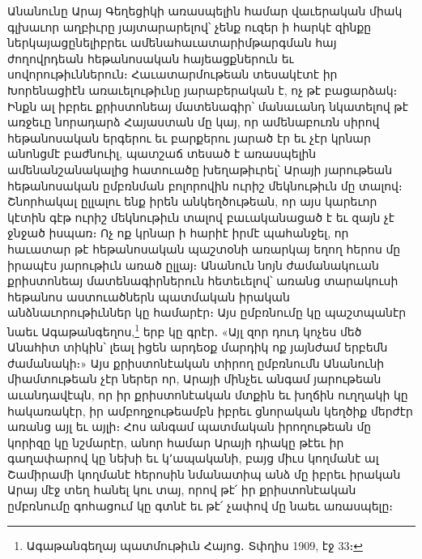 \documentclass{article}
\begin{document}
{Անանունը Արայ Գեղեցիկի առասպելին համար վաւերական միակ գլխաւոր աղբիւրը յայտարարելով՝ չենք ուզեր ի հարկէ զինքը ներկայացընելիբրեւ ամենահաւատարիմթարգման հայ ժողովրդեան հեթանոսական հայեացքներուն եւ սովորութիւններուն։ Հաւատարմութեան տեսակէտէ իր Խորենացիէն առաւելութիւնը յարաբերական է, ոչ թէ բացարձակ։ Ինքն ալ իբրեւ քրիստոնեայ մատենագիր՝ մանաւանդ նկատելով թէ առջեւը նորադարձ Հայաստան մը կայ, որ ամենաբուռն սիրով հեթանոսական երգերու եւ բարքերու յարած էր եւ չէր կրնար անոնցմէ բաժնուիլ, պատշաճ տեսած է առասպելին ամենանշանակալից հատուածը խեղաթիւրել՝ Արայի յարութեան հեթանոսական ըմբռնման բոլորովին ուրիշ մեկնութիւն մը տալով։ Շնորհակալ ըլլալու ենք իրեն անկեղծութեան, որ այս կարեւոր կէտին գէթ ուրիշ մեկնութիւն տալով բաւականացած է եւ զայն չէ ջնջած իսպառ։ Ոչ ոք կրնար ի հարիէ իրմէ պահանջել, որ հաւատար թէ հեթանոսական պաշտօնի առարկայ եղող հերոս մը իրապէս յարութիւն առած ըլլայ։ Անանուն նոյն ժամանակուան քրիստոնեայ մատենագիրներուն հետեւելով՝ առանց տարակուսի հեթանոս աստուածներն պատմական իրական անձնաւորութիւններ կը համարէր։ Այս ըմբռնումը կը պաշտպանէր նաեւ Ագաթանգեղոս,\footnote{Ագաթանգեղայ պատմութիւն Հայոց․ Տփղիս 1909, էջ 33։} երբ կը գրէր․ «Այլ զոր դուդ կոչես մեծ Անահիտ տիկին՝ լեալ իցեն արդեօք մարդիկ ոք յայնժամ երբեմն ժամանակի։» Այս քրիստոնէական տիրող ըմբռնումն Անանունի միամտութեան չէր ներեր որ, Արայի մինչեւ անգամ յարութեան աւանդավէպն, որ իր քրիստոնէական մտքին եւ խղճին ուղղակի կը հակառակէր, իր ամբողջութեամբն իբրեւ ցնորական կեղծիք մերժէր առանց այլ եւ այլի։ Հոս անգամ պատմական իրողութեան մը կորիզը կը նշմարէր, անոր համար Արայի դիակը թէեւ իր գաղափարով կը նեխի եւ կ՚ապականի, բայց միւս կողմանէ ալ Շամիրամի կողմանէ հերոսին նմանատիպ անձ մը իբրեւ իրական Արայ մէջ տեղ հանել կու տայ, որով թէ՛ իր քրիստոնէական ըմբռնումը գոհացում կը գտնէ եւ թէ՛ չափով մը նաեւ առասպելը։

}
\end{document}
